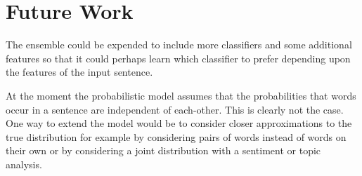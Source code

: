 \section{Future Work}
\label{sec:future_work}

The ensemble could be expended to include more classifiers and some additional
features so that it could perhaps learn which classifier to prefer depending
upon the features of the input sentence.

At the moment the probabilistic model assumes that the probabilities that words
occur in a sentence are independent of each-other. This is clearly not the case.
One way to extend the model would be to consider closer approximations to the
true distribution for example by considering pairs of words instead of words on
their own or by considering a joint distribution with a sentiment or topic
analysis. 